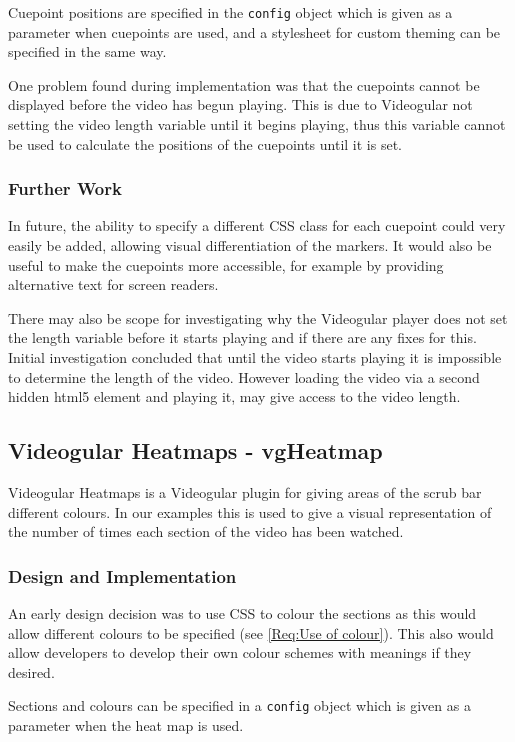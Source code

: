 Cuepoint positions are specified in the \texttt{config} object which is given as a parameter when cuepoints are used, and a stylesheet for custom theming can be specified in the same way.

One problem found during implementation was that the cuepoints cannot be displayed before the video has begun playing. This is due to \gls{Videogular} not setting the video length variable until it begins playing, thus this variable cannot be used to calculate the positions of the cuepoints until it is set.

\subsubsection{Further Work}
In future, the ability to specify a different \gls{CSS} class for each cuepoint could very easily be added, allowing visual differentiation of the markers. It would also be useful to make the cuepoints more accessible, for example by providing alternative text for screen readers.

There may also be scope for investigating why the Videogular player does not set the length variable before it starts playing and if there are any fixes for this. Initial investigation concluded that until the video starts playing it is impossible to determine the length of the video. However loading the video via a second hidden html5 element and playing it, may give access to the video length.

\subsection{Videogular Heatmaps - vgHeatmap}
\gls{Videogular} Heatmaps is a \gls{Videogular} plugin for giving areas of the scrub bar different colours. In our examples this is used to give a visual representation of the number of times each section of the video has been watched.

\subsubsection{Design and Implementation}
An early design decision was to use \gls{CSS} to colour the sections as this would allow different colours to be specified (see \cref{Req:Use of colour}). This also would allow developers to develop their own colour schemes with meanings if they desired.

Sections and colours can be specified in a \texttt{config} object which is given as a parameter when the heat map is used.

